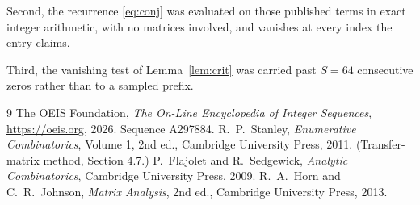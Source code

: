 \documentclass[11pt,a4paper]{article}
\theoremstyle{plain}
\theoremstyle{definition}
\begin{document}
Second, the recurrence \eqref{eq:conj} was evaluated on those published terms in exact
integer arithmetic, with no matrices involved, and vanishes at every index the entry claims.

Third, the vanishing test of Lemma~\ref{lem:crit} was carried past $S=64$ consecutive
zeros rather than to a sampled prefix.

\begin{thebibliography}{9}
 The OEIS Foundation, \emph{The On-Line Encyclopedia of Integer
Sequences}, \url{https://oeis.org}, 2026. Sequence A297884.
 R.~P.~Stanley, \emph{Enumerative Combinatorics}, Volume 1, 2nd ed.,
Cambridge University Press, 2011. (Transfer-matrix method, Section 4.7.)
 P.~Flajolet and R.~Sedgewick, \emph{Analytic Combinatorics}, Cambridge
University Press, 2009.
 R.~A.~Horn and C.~R.~Johnson, \emph{Matrix Analysis}, 2nd ed., Cambridge
University Press, 2013.
\end{thebibliography}
\end{document}
